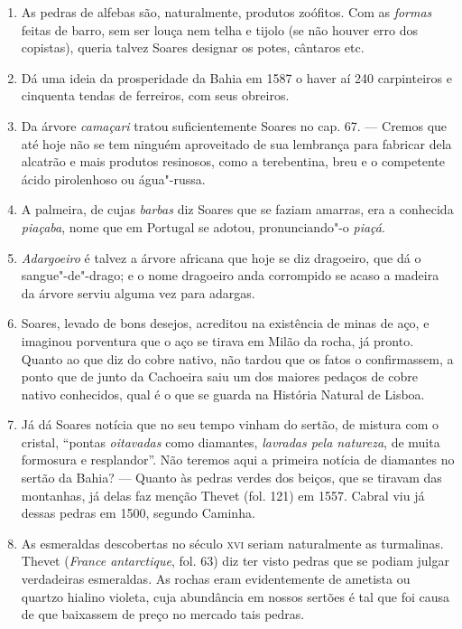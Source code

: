 \begin{enumerate}
\item As pedras de alfebas são, naturalmente, produtos zoófitos. Com as \textit{formas} 
feitas de barro, sem ser louça nem telha e tijolo (se não houver erro dos copistas), queria 
talvez Soares designar os potes, cântaros etc.

\item Dá uma ideia da prosperidade da Bahia em 1587 o haver aí 240 carpinteiros e cinquenta 
tendas de ferreiros, com seus obreiros.

\item Da árvore \textit{camaçari} tratou suficientemente Soares no cap. 67. --- Cremos que até 
hoje não se tem ninguém aproveitado de sua lembrança para fabricar dela alcatrão e 
mais produtos resinosos, como a terebentina, breu e o competente ácido pirolenhoso 
ou água"-russa.

\item A palmeira, de cujas \textit{barbas} diz Soares que se faziam amarras, era a conhecida 
\textit{piaçaba}, nome que em Portugal se adotou, pronunciando"-o \textit{piaçá}.

\item \textit{Adargoeiro} é talvez a árvore africana que hoje se diz dragoeiro, que dá o 
sangue"-de"-drago; e o nome dragoeiro anda corrompido se acaso a madeira da árvore serviu 
alguma vez para adargas.

\item Soares, levado de bons desejos, acreditou na existência de minas de aço, e 
imaginou porventura que o aço se tirava em Milão da rocha, já pronto.
Quanto ao que diz do cobre nativo, não tardou que os fatos o confirmassem, a ponto 
que de junto da Cachoeira saiu um dos maiores pedaços de cobre nativo conhecidos, qual é 
o que se guarda na História Natural de Lisboa.

\item  Já dá Soares notícia que no seu tempo vinham do sertão, de mistura 
com o cristal, ``pontas \textit{oitavadas} como diamantes, \textit{lavradas pela natureza},
de muita formosura e resplandor''. Não teremos aqui a primeira notícia de diamantes no sertão da Bahia? --- Quanto às 
pedras verdes dos beiços, que se tiravam das montanhas, já delas faz menção Thevet (fol. 
121) em 1557. Cabral viu já dessas pedras em 1500, segundo Caminha.

\item  As esmeraldas descobertas no século \textsc{xvi} seriam naturalmente as
turmalinas. Thevet (\textit{France antarctique}, fol. 63) diz ter visto pedras que
se podiam julgar verdadeiras esmeraldas.
As rochas eram evidentemente de ametista ou quartzo hialino violeta, cuja abundância 
em nossos sertões é tal que foi causa de que baixassem de preço no mercado tais pedras.


\end{enumerate}
